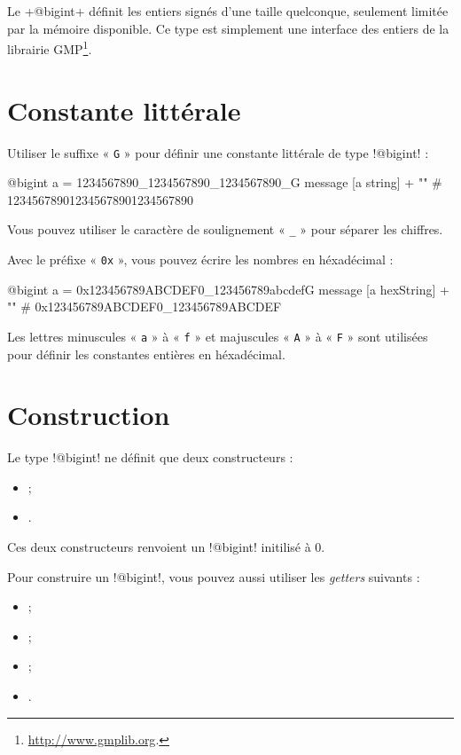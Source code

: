 

Le \ggs+@bigint+ définit les entiers signés d'une taille quelconque, seulement limitée par la mémoire disponible. Ce type est simplement une interface des entiers de la librairie GMP\footnote{\url{http://www.gmplib.org}.}.

\section{Constante littérale}

Utiliser le suffixe « \texttt{G} » pour définir une constante littérale de type \ggs!@bigint! :
\begin{galgas}
@bigint a = 1234567890_1234567890_1234567890_G
message [a string] + "\n" # 123456789012345678901234567890
\end{galgas}

Vous pouvez utiliser le caractère de soulignement « \texttt{\_} » pour séparer les chiffres.

Avec le préfixe « \texttt{0x} », vous pouvez écrire les nombres en héxadécimal :
\begin{galgas}
@bigint a = 0x123456789ABCDEF0_123456789abcdefG
message [a hexString] + "\n" # 0x123456789ABCDEF0_123456789ABCDEF
\end{galgas}

Les lettres minuscules « \texttt{a} » à « \texttt{f} » et majuscules « \texttt{A} » à « \texttt{F} » sont utilisées pour définir les constantes entières en héxadécimal.

\section{Construction}

Le type \ggs!@bigint! ne définit que deux constructeurs :
\begin{itemize}
  \item {} ;
  \item {}.
\end{itemize}

Ces deux constructeurs renvoient un \ggs!@bigint! initilisé à $0$.

Pour construire un \ggs!@bigint!, vous pouvez aussi utiliser les \emph{getters} suivants :
\begin{itemize}
  \item {} ;
  \item {} ;
  \item {} ;
  \item {}.
\end{itemize}

